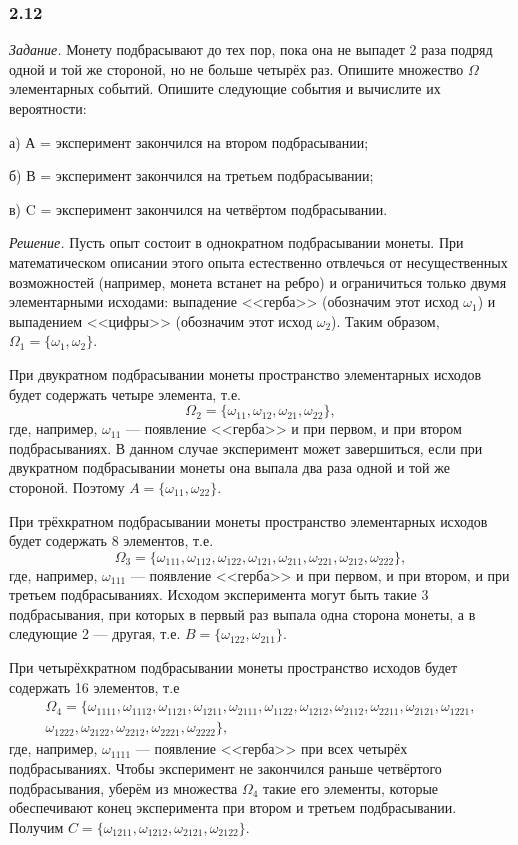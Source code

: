 \documentclass{book}
\begin{document}
\subsubsection*{2.12}

\textit{Задание.} Монету подбрасывают до тех пор, пока она не выпадет 2 раза подряд одной и той же стороной, но не больше четырёх раз.
Опишите множество $ \Omega $ элементарных событий.
Опишите следующие события и вычислите их вероятности:

а) А = { эксперимент закончился на втором подбрасывании};

б) В = { эксперимент закончился на третьем подбрасывании};

в) C = { эксперимент закончился на четвёртом подбрасывании}.

\textit{Решение.}  Пусть опыт состоит в однократном подбрасывании монеты.
При математическом описании этого опыта естественно отвлечься от несущественных возможностей
(например, монета встанет на ребро) и ограничиться только двумя элементарными исходами:
выпадение <<герба>> (обозначим этот исход $ \omega_1 $) и выпадением <<цифры>> (обозначим этот исход $ \omega_2 $).
Таким образом, $ \Omega_1 = \{ \omega_1, \omega_2 \} $.

При двукратном подбрасывании монеты пространство элементарных исходов будет содержать четыре элемента, т.е.
$$ \Omega_2 = \{ \omega_{11}, \omega_{12}, \omega_{21}, \omega_{22} \},$$
где, например, $ \omega_{11} $ --- появление <<герба>> и при первом, и при втором подбрасываниях.
В данном случае эксперимент может завершиться, если при двукратном подбрасывании монеты она выпала два раза одной и той же стороной.
Поэтому $ A = \{ \omega_{11}, \omega_{22} \} $.

При трёхкратном подбрасывании монеты пространство элементарных исходов будет содержать 8 элементов, т.е.
$$ \Omega_3 =
\{ \omega_{111}, \omega_{112}, \omega_{122}, \omega_{121}, \omega_{211}, \omega_{221}, \omega_{212}, \omega_{222} \},$$
где, например, $ \omega_{111} $ --- появление <<герба>> и при первом, и при втором, и при третьем подбрасываниях.
Исходом эксперимента могут быть такие 3 подбрасывания, при которых в первый раз выпала одна сторона монеты, а в следующие 2 --- другая, т.е.
$ B = \{ \omega_{122}, \omega_{211} \} $.

При четырёхкратном подбрасывании монеты пространство исходов будет содержать 16 элементов, т.е
\begin{equation*}
\begin{split}
\Omega_4 =
\{ \omega_{1111}, \omega_{1112}, \omega_{1121}, \omega_{1211}, \omega_{2111}, \omega_{1122}, \omega_{1212}, \omega_{2112}, \omega_{2211}, \omega_{2121}, \omega_{1221}, \\
\omega_{1222}, \omega_{2122}, \omega_{2212}, \omega_{2221}, \omega_{2222}\},
\end{split}
\end{equation*}
где, например, $ \omega_{1111} $ --- появление <<герба>> при всех четырёх подбрасываниях.
Чтобы эксперимент не закончился раньше четвёртого подбрасывания, уберём из множества
$ \Omega_4 $ такие его элементы, которые обеспечивают конец эксперимента при втором и третьем подбрасывании.
Получим $ C = \{ \omega_{1211}, \omega_{1212}, \omega_{2121}, \omega_{2122} \} $.
\end{document}
